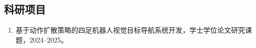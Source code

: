 ﻿%

\begin{achievements}

\subsection*{科研项目}

\begin{enumerate}
  \item 基于动作扩散策略的四足机器人视觉目标导航系统开发，学士学位论文研究课题，2024--2025。
\end{enumerate}

\end{achievements}
